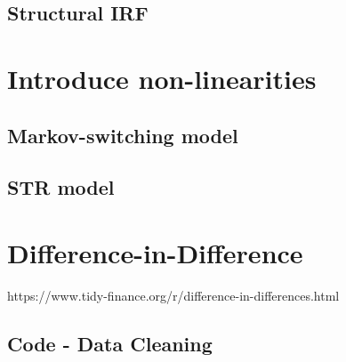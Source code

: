 \documentclass[hidelinks,12pts]{article}
\DeclareMathOperator{\1}{\mathbbm{1}}
\begin{document}
    \subsection{Structural IRF}\label{sec:structural_irf}



\section{Introduce non-linearities}\label{sec:nonlinearities}
    \subsection{Markov-switching model}\label{sec:markov}

    
    \subsection{STR model}\label{sec:str}



\section{Difference-in-Difference}
https://www.tidy-finance.org/r/difference-in-differences.html
    



\newpage
\begin{appendices}
    
    \section{Code - Data Cleaning} \label{sec:dta_clean}
        

\end{appendices}
\end{document}
